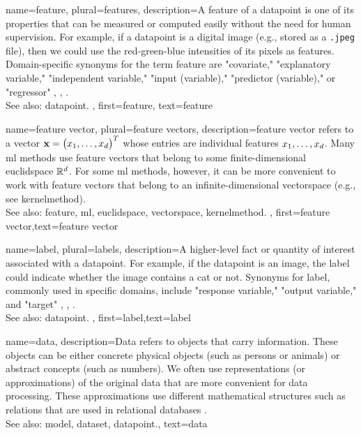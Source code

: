{name={feature}, plural={features},
	description={A feature of a \gls{datapoint} is one of its properties that can be 
		measured or computed easily without the need for human supervision. For example, if a \gls{datapoint} 
		is a digital image (e.g., stored as a \texttt{.jpeg} file), then we could use the red-green-blue intensities 
		of its pixels as features. Domain-specific synonyms for the term feature are "covariate," "explanatory variable," 
		"independent variable," "input (variable)," "predictor (variable)," or "regressor" \cite{Gujarati2021}, \cite{Dodge2003}, \cite{Everitt2022}. 
				\\
		See also: \gls{datapoint}.
		}, first={feature},
		text={feature}  
}

{name={feature vector}, plural={feature vectors},
	description={\Gls{feature} vector refers to a vector ${\bf x} = \big(x_{1},\ldots,x_{d}\big)^{T}$ 
	whose entries are individual \glspl{feature} $x_{1},\ldots,x_{d}$. Many \gls{ml} methods 
	use \gls{feature} vectors that belong to some finite-dimensional \gls{euclidspace} $\mathbb{R}^{d}$. 
	For some \gls{ml} methods, however, it can be more convenient to work with \gls{feature} 
	vectors that belong to an infinite-dimensional \gls{vectorspace} (e.g., see \gls{kernelmethod}). 
			\\
		See also: \gls{feature}, \gls{ml}, \gls{euclidspace}, \gls{vectorspace}, \gls{kernelmethod}.
		}, first={feature vector},text={feature vector}  
}


{name={label}, plural={labels},
	description={A higher-level fact or quantity of interest associated with a \gls{datapoint}. 
		For example, if the \gls{datapoint} is an image, the label could indicate whether the 
		image contains a cat or not. Synonyms for label, commonly used in specific domains, 
		include "response variable," "output variable," and "target" \cite{Gujarati2021}, \cite{Dodge2003}, \cite{Everitt2022}.
				\\
		See also: \gls{datapoint}.
 },
	first={label},text={label}  
}


{name={data},
	 description={Data refers to objects that carry information. These 
	 	objects can be either concrete physical objects (such as persons or animals) 
	 	or abstract concepts (such as numbers). We often use representations (or 
	 	approximations) of the original data that are more convenient for data processing. 
	 	These approximations use different mathematical structures such as relations 
		that are used in relational databases \cite{silberschatz2019database,codd1970relational}.
				\\
		See also: \gls{model}, \gls{dataset}, \gls{datapoint}.}, 
	text={data}
}

